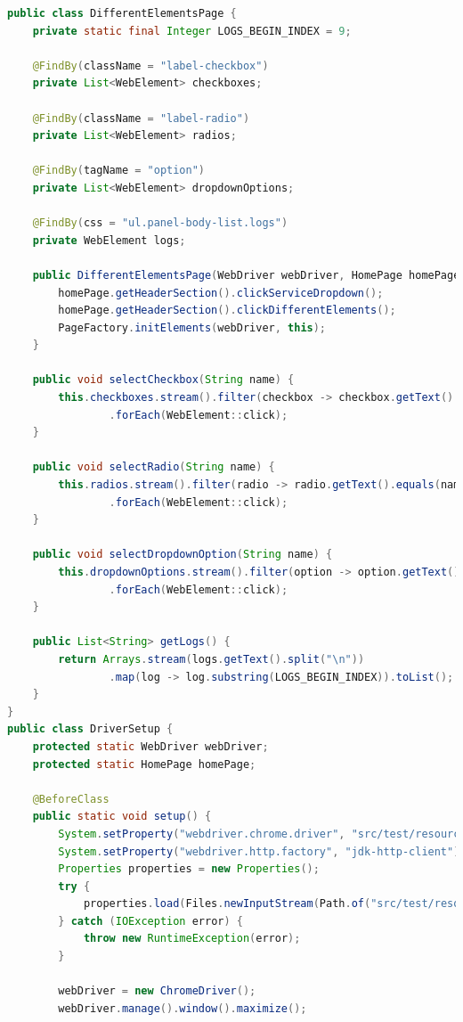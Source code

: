 \documentclass[a4paper]{article}
\begin{document}
    \begin{lstlisting}[language=Java]
public class DifferentElementsPage {
    private static final Integer LOGS_BEGIN_INDEX = 9;

    @FindBy(className = "label-checkbox")
    private List<WebElement> checkboxes;

    @FindBy(className = "label-radio")
    private List<WebElement> radios;

    @FindBy(tagName = "option")
    private List<WebElement> dropdownOptions;

    @FindBy(css = "ul.panel-body-list.logs")
    private WebElement logs;

    public DifferentElementsPage(WebDriver webDriver, HomePage homePage) {
        homePage.getHeaderSection().clickServiceDropdown();
        homePage.getHeaderSection().clickDifferentElements();
        PageFactory.initElements(webDriver, this);
    }

    public void selectCheckbox(String name) {
        this.checkboxes.stream().filter(checkbox -> checkbox.getText().equals(name))
                .forEach(WebElement::click);
    }

    public void selectRadio(String name) {
        this.radios.stream().filter(radio -> radio.getText().equals(name))
                .forEach(WebElement::click);
    }

    public void selectDropdownOption(String name) {
        this.dropdownOptions.stream().filter(option -> option.getText().equals(name))
                .forEach(WebElement::click);
    }

    public List<String> getLogs() {
        return Arrays.stream(logs.getText().split("\n"))
                .map(log -> log.substring(LOGS_BEGIN_INDEX)).toList();
    }
}
public class DriverSetup {
    protected static WebDriver webDriver;
    protected static HomePage homePage;

    @BeforeClass
    public static void setup() {
        System.setProperty("webdriver.chrome.driver", "src/test/resources/chromedriver");
        System.setProperty("webdriver.http.factory", "jdk-http-client");
        Properties properties = new Properties();
        try {
            properties.load(Files.newInputStream(Path.of("src/test/resources/data.properties")));
        } catch (IOException error) {
            throw new RuntimeException(error);
        }

        webDriver = new ChromeDriver();
        webDriver.manage().window().maximize();


\end{lstlisting}
\end{document}
